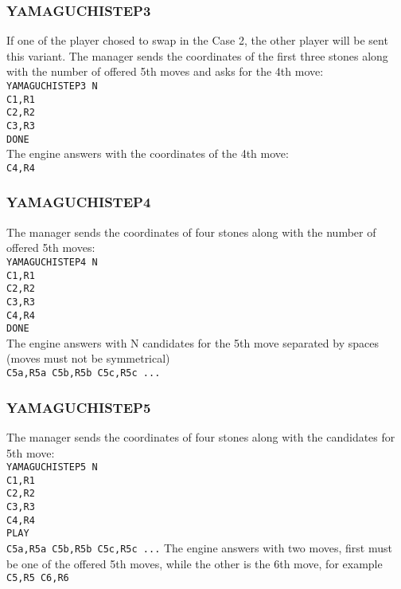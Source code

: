\documentclass[12pt,a4paper]{article}
\begin{document}
\subsubsection{YAMAGUCHISTEP3}
If one of the player chosed to swap in the Case 2, the other player will be sent this variant. The manager sends the coordinates of the first three stones along with the number of offered 5th moves and asks for the 4th move:\\
\texttt{YAMAGUCHISTEP3 N}\\
\texttt{C1,R1}\\
\texttt{C2,R2}\\
\texttt{C3,R3}\\
\texttt{DONE}\\
The engine answers with the coordinates of the 4th move:\\
\texttt{C4,R4}

\subsubsection{YAMAGUCHISTEP4}
The manager sends the coordinates of four stones along with the number of offered 5th moves:\\
\texttt{YAMAGUCHISTEP4 N}\\
\texttt{C1,R1}\\
\texttt{C2,R2}\\
\texttt{C3,R3}\\
\texttt{C4,R4}\\
\texttt{DONE}\\
The engine answers with N candidates for the 5th move separated by spaces (moves must not be symmetrical)\\
\texttt{C5a,R5a C5b,R5b C5c,R5c ...}

\subsubsection{YAMAGUCHISTEP5}
The manager sends the coordinates of four stones along with the candidates for 5th move:\\
\texttt{YAMAGUCHISTEP5 N}\\
\texttt{C1,R1}\\
\texttt{C2,R2}\\
\texttt{C3,R3}\\
\texttt{C4,R4}\\
\texttt{PLAY}\\
\texttt{C5a,R5a C5b,R5b C5c,R5c ...}
The engine answers with two moves, first must be one of the offered 5th moves, while the other is the 6th move, for example\\
\texttt{C5,R5 C6,R6}
\end{document}
